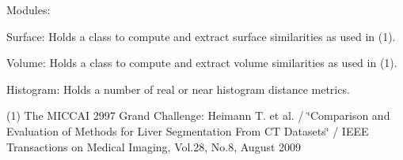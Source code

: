 Modules:
\begin{DoxyItemize}
\item Surface: Holds a class to compute and extract surface similarities as used in (1).
\item Volume: Holds a class to compute and extract volume similarities as used in (1).
\item Histogram: Holds a number of real or near histogram distance metrics.
\end{DoxyItemize}

(1) The MICCAI 2997 Grand Challenge: Heimann T. et al. / \char`\"{}Comparison and Evaluation of
 Methods for Liver Segmentation From CT Datasets\char`\"{} / IEEE Transactions on Medical Imaging, Vol.28, No.8, August 2009 